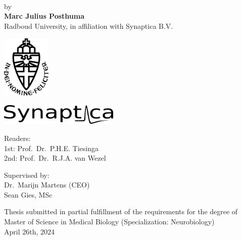 \documentclass[12pt]{report}
\begin{document}
\pagestyle{fancy} %

\begin{titlepage}
    \centering
    \vspace*{1cm}
    \\
    \\
    \\[1cm]
    \Large by\\[1cm]
    \Large \textbf{Marc Julius Posthuma}\\[1cm]
    \Large Radboud University, in affiliation with Synaptica B.V.\\[2cm]

    \noindent
    \begin{minipage}[c]{0.5\textwidth}
        \centering
        \includegraphics[height=3cm,keepaspectratio]{Radboud_Universiteit_Nijmegen-logo.png}
    \end{minipage}%
    \begin{minipage}[c]{0.5\textwidth}
        \centering
        \includegraphics[height=1cm,keepaspectratio]{synaptica_logo.png}
    \end{minipage}

    \vspace{1cm} %

    \noindent
    \begin{minipage}[t]{0.5\textwidth}
        \centering
        \Large Readers:\\
        1st: Prof.\ Dr.\ P.H.E. Tiesinga\\
        2nd: Prof.\ Dr.\ R.J.A. van Wezel
    \end{minipage}%
    \begin{minipage}[t]{0.5\textwidth}
        \centering
        \Large Supervised by:\\
        Dr.\ Marijn Martens (CEO)\\
        Sean Gies, MSc
    \end{minipage}

    \vfill

    \footnotesize Thesis submitted in partial fulfillment of the requirements
    for the degree of Master of Science in Medical Biology (Specialization: Neurobiology)\\[1cm]
    \Large April 26th, 2024
\end{titlepage}
\end{document}
